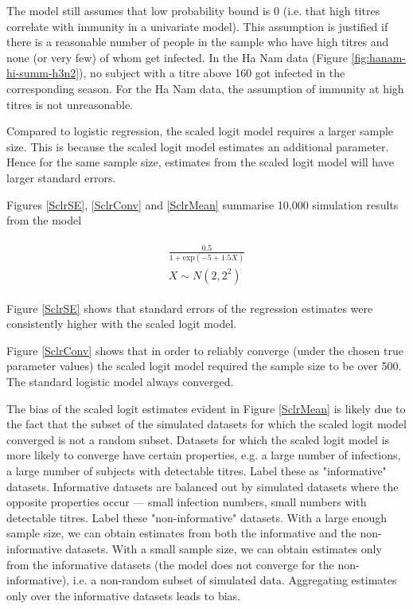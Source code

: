 The model still assumes that low probability bound is 0 (i.e. that high titres correlate with immunity in a univariate model). This assumption is justified if there is a reasonable number of people in the sample who have high titres and none (or very few) of whom get infected. In the Ha Nam data (Figure \ref{fig:hanam-hi-summ-h3n2}), no subject with a titre above 160 got infected in the corresponding season. For the Ha Nam data, the assumption of immunity at high titres is not unreasonable.

Compared to logistic regression, the scaled logit model requires a larger sample size. This is because the scaled logit model estimates an additional parameter. Hence for the same sample size, estimates from the scaled logit model will have larger standard errors.

Figures \ref{SclrSE}, \ref{SclrConv} and \ref{SclrMean} summarise 10,000 simulation results from the model

\begin{align*}
	\begin{gathered}
		\frac{0.5}{1 + \text{exp}(-5 + 1.5 X)} \\
		X \sim N(2, 2^2)
	\end{gathered}
\end{align*}

Figure \ref{SclrSE} shows that standard errors of the regression estimates were consistently higher with the scaled logit model.

Figure \ref{SclrConv} shows that in order to reliably converge (under the chosen true parameter values) the scaled logit model required the sample size to be over 500. The standard logistic model always converged.

The bias of the scaled logit estimates evident in Figure \ref{SclrMean} is likely due to the fact that the subset of the simulated datasets for which the scaled logit model converged is not a random subset. Datasets for which the scaled logit model is more likely to converge have certain properties, e.g. a large number of infections, a large number of subjects with detectable titres. Label these as "informative" datasets. Informative datasets are balanced out by simulated datasets where the opposite properties occur --- small infection numbers, small numbers with detectable titres. Label these "non-informative" datasets. With a large enough sample size, we can obtain estimates from both the informative and the non-informative datasets. With a small sample size, we can obtain estimates only from the informative datasets (the model does not converge for the non-informative), i.e. a non-random subset of simulated data. Aggregating estimates only over the informative datasets leads to bias.

